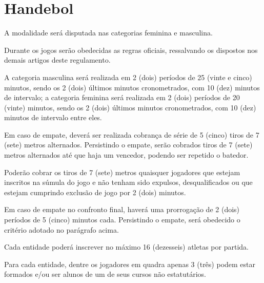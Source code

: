 {\let\clearpage\relax \chapter{Handebol}}

\begin{article}
	A modalidade será disputada nas categorias feminina e masculina.
\end{article}

\begin{article}
	Durante os jogos serão obedecidas as regras oficiais, ressalvando os dispostos nos demais artigos deste regulamento.
\end{article}

\begin{article}
	A categoria masculina será realizada em 2 (dois) períodos de 25 (vinte e cinco) minutos, sendo os 2 (dois) últimos minutos cronometrados, com 10 (dez) minutos de intervalo; a categoria feminina será realizada em 2 (dois) períodos de 20 (vinte) minutos, sendo os 2 (dois) últimos minutos cronometrados, com 10 (dez) minutos de intervalo entre eles.

	\begin{xparagraph}
		Em caso de empate, deverá ser realizada cobrança de série de 5 (cinco) tiros de 7 (sete) metros alternados. Persistindo o empate, serão cobrados tiros de 7 (sete) metros alternados até que haja um vencedor, podendo ser repetido o batedor.
	\end{xparagraph}

	\begin{xparagraph}
		Poderão cobrar os tiros de 7 (sete) metros quaisquer jogadores que estejam inscritos na súmula do jogo e não tenham sido expulsos, desqualificados ou que estejam cumprindo exclusão de jogo por 2 (dois) minutos.
	\end{xparagraph}

	\begin{xparagraph}
		Em caso de empate no confronto final, haverá uma prorrogação de 2 (dois) períodos de 5 (cinco) minutos cada. Persistindo o empate, será obedecido o critério adotado no parágrafo acima.
	\end{xparagraph}
\end{article}

\begin{article}
	Cada entidade poderá inscrever no máximo 16 (dezesseis) atletas por partida.
\end{article}

\begin{article}
	Para cada entidade, dentre os jogadores em quadra apenas 3 (três) podem estar formados e/ou ser alunos de um de seus cursos não estatutários.
\end{article}
